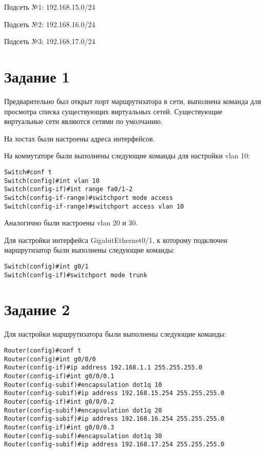 Подсеть №1: 192.168.15.0/24

Подсеть №2: 192.168.16.0/24

Подсеть №3: 192.168.17.0/24

\section*{Задание 1}

Предварительно был открыт порт маршрутизатора в сети, выполнена команда  для просмотра списка существующих виртуальных сетей. Существующие виртуальные сети являются сетями по умолчанию.

На хостах были настроены адреса интерфейсов.

На коммутаторе были выполнены следующие команды для настройки vlan 10:
\begin{lstlisting}[numbers=none]
Switch#conf t
Switch(config)#int vlan 10
Switch(config-if)#int range fa0/1-2
Switch(config-if-range)#switchport mode access
Switch(config-if-range)#switchport access vlan 10
\end{lstlisting}

Аналогично были настроены vlan 20 и 30.

Для настройки интерфейса GigabitEthernet0/1, к которому подключен маршрутизатор были выполнены следующие команды:
\begin{lstlisting}[numbers=none]
Switch(config)#int g0/1
Switch(config-if)#switchport mode trunk
\end{lstlisting}

\section*{Задание 2}

Для настройки маршрутизатора были выполнены следующие команды:
\begin{lstlisting}[numbers=none]
Router(config)#conf t
Router(config)#int g0/0/0
Router(config-if)#ip address 192.168.1.1 255.255.255.0
Router(config-if)#int g0/0/0.1
Router(config-subif)#encapsulation dot1q 10
Router(config-subif)#ip address 192.168.15.254 255.255.255.0
Router(config-if)#int g0/0/0.2
Router(config-subif)#encapsulation dot1q 20
Router(config-subif)#ip address 192.168.16.254 255.255.255.0
Router(config-if)#int g0/0/0.3
Router(config-subif)#encapsulation dot1q 30
Router(config-subif)#ip address 192.168.17.254 255.255.255.0
\end{lstlisting}
